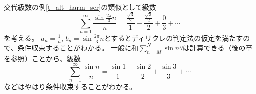 \begin{example}
交代級数の例\ref{t_alt_harm_ser}の類似として級数
$$
\sum_{n = 1}^\infty \frac{\sin\frac{2\pi}{3}n}{n} = \frac{\frac{\sqrt{3}}{2}}{1}-\frac{\frac{\sqrt{3}}{2}}{2}+\frac{0}{3}+\cdots
$$
を考える。
$a_n = \frac{1}{n}$, $b_n = \sin\frac{2\pi}{3}n$とするとディリクレの判定法の仮定を満たすので、条件収束することがわかる。
一般に和$\sum_{n = M}^N \sin n\theta$は計算できる（後の章を参照）ことから、級数
$$
\sum_{n = 1}^\infty \frac{\sin n}{n} = \frac{\sin 1}{1}+\frac{\sin 2}{2}+\frac{\sin 3}{3}+\cdots
$$
などはやはり条件収束することがわかる。
\end{example}

